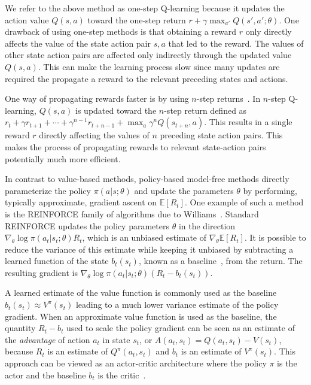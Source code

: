 \documentclass{article} %
\begin{document}
%
%
%
%
%
%

We refer to the above method as one-step Q-learning because it updates the action value $Q(s,a)$ toward the one-step return $r+\gamma \max_{a'}Q(s',a';\theta)$.
%
One drawback of using one-step methods is that obtaining a reward $r$ only directly affects the value of the state action pair $s,a$ that led to the reward.
The values of other state action pairs are affected only indirectly through the updated value $Q(s,a)$.
This can make the learning process slow since many updates are required the propagate a reward to the relevant preceding states and actions.

%
%

One way of propagating rewards faster is by using $n$-step returns~\citep{watkins1989learning,peng1996msq}. In $n$-step Q-learning, $Q(s,a)$ is updated toward the $n$-step return defined as
%
    $r_t + \gamma r_{t+1} + \cdots + \gamma^{n-1} r_{t+n-1} + \max_a \gamma^n Q(s_{t+n}, a)$.
%
This results in a single reward $r$ directly affecting the values of $n$ preceding state action pairs.
This makes the process of propagating rewards to relevant state-action pairs potentially much more efficient.

%
%

In contrast to value-based methods, policy-based model-free methods directly parameterize the policy $\pi(a|s;\theta)$ and update the parameters $\theta$ by performing, typically approximate, gradient ascent on $\mathbb{E}[R_t]$.
One example of such a method is the REINFORCE family of algorithms due to Williams~.
Standard REINFORCE updates the policy parameters $\theta$ in the direction $\nabla_{\theta}\log\pi(a_t|s_t;\theta) R_t$, which is an unbiased estimate of $\nabla_{\theta} \mathbb{E}[R_t]$.
It is possible to reduce the variance of this estimate while keeping it unbiased by subtracting a learned function of the state $b_t(s_t)$, known as a baseline~\citep{Williams1992}, from the return.
The resulting gradient is
%
$\nabla_{\theta}\log\pi(a_t|s_t;\theta) \left(R_t-b_t(s_t)\right)$.
%

A learned estimate of the value function is commonly used as the baseline $b_t(s_t)\approx V^{\pi}(s_t)$ leading to a much lower variance estimate of the policy gradient.
When an approximate value function is used as the baseline, the quantity $R_t-b_t$ used to scale the policy gradient can be seen as an estimate of the \emph{advantage} of action $a_t$ in state $s_t$, or $A(a_t,s_t)=Q(a_t,s_t)-V(s_t)$, because $R_t$ is an estimate of $Q^{\pi}(a_t,s_t)$ and $b_t$ is an estimate of $V^{\pi}(s_t)$.
This approach can be viewed as an actor-critic architecture where the policy $\pi$ is the actor and the baseline $b_t$ is the critic~\citep{sutton:book,degris2012model}.
\end{document}
